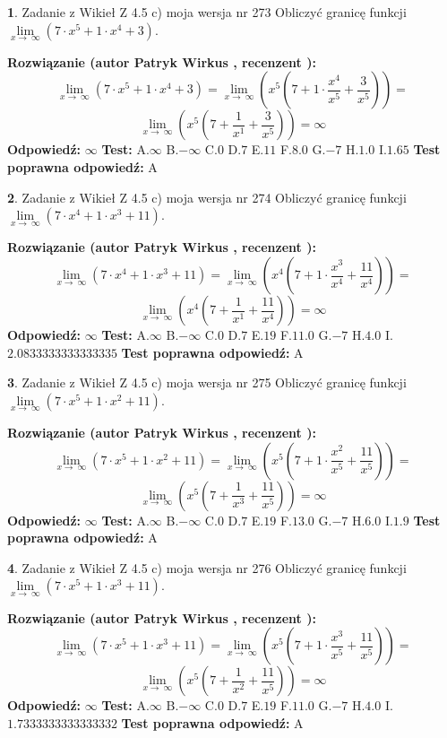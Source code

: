 \documentclass[12pt, a4paper]{article}
\theoremstyle{definition} %
\newtheorem{zad}{}
\newcommand{\zadStart}[1]{\begin{zad}#1\newline}
\newcommand{\zadStop}{\end{zad}}
\newcommand{\rozwStart}[2]{\noindent \textbf{Rozwiązanie (autor #1 , recenzent #2): }\newline}
\newcommand{\rozwStop}{\newline}
\newcommand{\odpStart}{\noindent \textbf{Odpowiedź:}\newline}
\newcommand{\odpStop}{\newline}
\newcommand{\testStart}{\noindent \textbf{Test:}\newline}
\newcommand{\testStop}{\newline}
\newcommand{\kluczStart}{\noindent \textbf{Test poprawna odpowiedź:}\newline}
\newcommand{\kluczStop}{\newline}
\begin{document}
\zadStart{Zadanie z Wikieł Z 4.5 c) moja wersja nr 273}
Obliczyć granicę funkcji  $\lim\limits_{x\to\ \infty}(7 \cdot x^{5}+1 \cdot x^{4}+3)$.
\zadStop
\rozwStart{Patryk Wirkus}{}
$$\lim\limits_{x\to\ \infty}(7 \cdot x^{5}+1 \cdot x^{4}+3) = \lim\limits_{x\to\ \infty}(x^{5}(7 +1 \cdot \frac{x^{4}}{x^{5}}+\frac{3}{x^{5}})) =$$ $$\lim\limits_{x\to\ \infty}(x^{5}(7 +\frac{1}{x^{1}}+\frac{3}{x^{5}})) =\infty$$
\rozwStop
\odpStart
$\infty$
\odpStop
\testStart
A.$\infty$ B.$-\infty$ C.$0$ D.$7$ E.$11$
F.$8.0$ G.$-7$
H.$1.0$
I.$1.65$
\testStop
\kluczStart
A
\kluczStop



\zadStart{Zadanie z Wikieł Z 4.5 c) moja wersja nr 274}
Obliczyć granicę funkcji  $\lim\limits_{x\to\ \infty}(7 \cdot x^{4}+1 \cdot x^{3}+11)$.
\zadStop
\rozwStart{Patryk Wirkus}{}
$$\lim\limits_{x\to\ \infty}(7 \cdot x^{4}+1 \cdot x^{3}+11) = \lim\limits_{x\to\ \infty}(x^{4}(7 +1 \cdot \frac{x^{3}}{x^{4}}+\frac{11}{x^{4}})) =$$ $$\lim\limits_{x\to\ \infty}(x^{4}(7 +\frac{1}{x^{1}}+\frac{11}{x^{4}})) =\infty$$
\rozwStop
\odpStart
$\infty$
\odpStop
\testStart
A.$\infty$ B.$-\infty$ C.$0$ D.$7$ E.$19$
F.$11.0$ G.$-7$
H.$4.0$
I.$2.0833333333333335$
\testStop
\kluczStart
A
\kluczStop



\zadStart{Zadanie z Wikieł Z 4.5 c) moja wersja nr 275}
Obliczyć granicę funkcji  $\lim\limits_{x\to\ \infty}(7 \cdot x^{5}+1 \cdot x^{2}+11)$.
\zadStop
\rozwStart{Patryk Wirkus}{}
$$\lim\limits_{x\to\ \infty}(7 \cdot x^{5}+1 \cdot x^{2}+11) = \lim\limits_{x\to\ \infty}(x^{5}(7 +1 \cdot \frac{x^{2}}{x^{5}}+\frac{11}{x^{5}})) =$$ $$\lim\limits_{x\to\ \infty}(x^{5}(7 +\frac{1}{x^{3}}+\frac{11}{x^{5}})) =\infty$$
\rozwStop
\odpStart
$\infty$
\odpStop
\testStart
A.$\infty$ B.$-\infty$ C.$0$ D.$7$ E.$19$
F.$13.0$ G.$-7$
H.$6.0$
I.$1.9$
\testStop
\kluczStart
A
\kluczStop



\zadStart{Zadanie z Wikieł Z 4.5 c) moja wersja nr 276}
Obliczyć granicę funkcji  $\lim\limits_{x\to\ \infty}(7 \cdot x^{5}+1 \cdot x^{3}+11)$.
\zadStop
\rozwStart{Patryk Wirkus}{}
$$\lim\limits_{x\to\ \infty}(7 \cdot x^{5}+1 \cdot x^{3}+11) = \lim\limits_{x\to\ \infty}(x^{5}(7 +1 \cdot \frac{x^{3}}{x^{5}}+\frac{11}{x^{5}})) =$$ $$\lim\limits_{x\to\ \infty}(x^{5}(7 +\frac{1}{x^{2}}+\frac{11}{x^{5}})) =\infty$$
\rozwStop
\odpStart
$\infty$
\odpStop
\testStart
A.$\infty$ B.$-\infty$ C.$0$ D.$7$ E.$19$
F.$11.0$ G.$-7$
H.$4.0$
I.$1.7333333333333332$
\testStop
\kluczStart
A
\kluczStop
\end{document}
